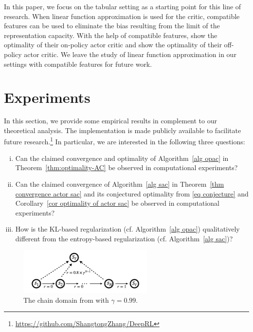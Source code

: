 \documentclass[twoside,11pt]{article}
\numberwithin{assucounter}{section}
\begin{document}
In this paper,
we focus on the tabular setting as a starting point for this line of research. 
When linear function approximation is used for the critic,
compatible features \citep{sutton2000policy,konda2002thesis,zhang2019provably} can be used to eliminate the bias resulting from the limit of the representation capacity.
With the help of compatible features,
\citet{liu2020improved} show the optimality of their on-policy actor critic and
\citet{xu2021doubly} show the optimality of their off-policy actor critic.
We leave the study of linear function approximation in our settings with compatible features for future work.

\section{Experiments}

In this section,
we provide some empirical results in complement to our theoretical analysis. 
The implementation is made publicly available to facilitate future research.\footnote{\url{https://github.com/ShangtongZhang/DeepRL}}
In particular,
we are interested in the following three questions:
\begin{enumerate}[(i).]
  \item Can the claimed convergence and optimality of Algorithm~\ref{alg opac} in Theorem~\ref{thm:optimality-AC} be observed in computational experiments?
  \item Can the claimed convergence of Algorithm~\ref{alg sac} in Theorem~\ref{thm convergence actor sac} and its conjectured optimality from \eqref{eq conjecture} and Corollary~\ref{cor optimality of actor sac} be observed in computational experiments? 
  \item How is the KL-based regularization (cf. Algorithm~\ref{alg opac}) qualitatively different from the entropy-based regularization (cf. Algorithm~\ref{alg sac})?
\end{enumerate}
\begin{figure}[h]
  \centering
  \includegraphics[width=0.6\textwidth]{img/chain.png}
  \caption{\label{fig chain} The chain domain from \citet{laroche2021dr} with $\gamma = 0.99$.}
\end{figure}
\end{document}
